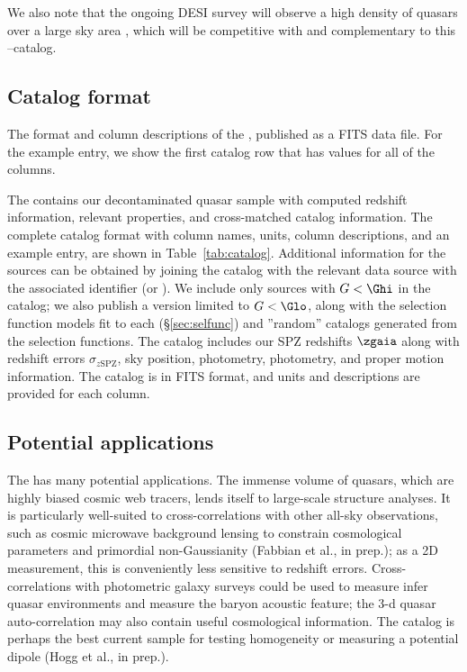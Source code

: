 We also note that the ongoing DESI survey \citep{Aghamousa2016} will observe a high density of quasars over a large sky area \citep{yeche_preliminary_2020}, which will be competitive with and complementary to this \Gaia--\unWISE catalog.


\subsection{Catalog format}
\label{sec:format}

\begin{table}
    \caption{The format and column descriptions of the \catalog, published as a FITS data file. For the example entry, we show the first catalog row that has values for all of the columns.}
    \centering
    
    \label{tab:catalog}
\end{table}

The \catalog contains our decontaminated quasar sample with computed redshift information, relevant \Gaia properties, and cross-matched catalog information.
The complete catalog format with column names, units, column descriptions, and an example entry, are shown in Table~\ref{tab:catalog}.
Additional information for the sources can be obtained by joining the catalog with the relevant data source with the associated identifier (\Gaia or \unWISE).
We include only sources with $G<\Ghi$ in the catalog; we also publish a version limited to $G<\Glo$, along with the selection function models fit to each (\S\ref{sec:selfunc}) and ''random'' catalogs generated from the selection functions.
The catalog includes our SPZ redshifts $\zgaia$ along with redshift errors $\sigma_{z\mathrm{SPZ}}$, sky position, \Gaia photometry, \unWISE photometry, and proper motion information.
The catalog is in FITS format, and units and descriptions are provided for each column.


\subsection{Potential applications}
\label{sec:applications}

The \catalog has many potential applications.
The immense volume of quasars, which are highly biased cosmic web tracers, lends itself to large-scale structure analyses.
It is particularly well-suited to cross-correlations with other all-sky observations, such as cosmic microwave background lensing to constrain cosmological parameters and primordial non-Gaussianity (Fabbian et al., in prep.); as a 2D measurement, this is conveniently less sensitive to redshift errors. 
Cross-correlations with photometric galaxy surveys could be used to measure infer quasar environments and measure the baryon acoustic feature; the 3-d quasar auto-correlation may also contain useful cosmological information.
The catalog is perhaps the best current sample for testing homogeneity or measuring a potential dipole (Hogg et al., in prep.).

